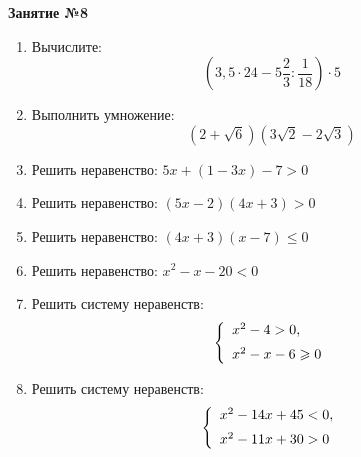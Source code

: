 \documentclass[12pt, a4paper]{article}
\begin{document}
	
	   \cfoot{}
	\begin{center}
		\Large
		\textbf{Занятие №8}
	\end{center}
	\begin{enumerate}[label=\textbf{\arabic*.}]
		\item Вычислите: $$\left( 3,5 \cdot 24 - 5\dfrac{2}{3}:\dfrac{1}{18}\right)\cdot 5 $$
		\item Выполнить умножение: $$(2+\sqrt{6})(3\sqrt{2}-2\sqrt{3})$$
		\item Решить неравенство: \( 5x+(1-3x)-7>0 \)
		\item Решить неравенство: \( (5x-2)(4x+3)>0 \)
		\item Решить неравенство: \( (4x+3)(x-7)\leqslant0 \)
		\item Решить неравенство: \( x^2-x-20<0\)
		\item Решить систему неравенств:
		$$\left\{
		\begin{array}{l}
			x^2-4>0,\vspace{0,2cm}\\
			x^2-x-6\geqslant0
		\end{array}
		\right.$$
		\item Решить систему неравенств:
		$$\left\{
		\begin{array}{l}
			x^2-14x+45<0,\vspace{0,2cm}\\
			x^2-11x+30>0
		\end{array}
		\right.$$
	\end{enumerate}
\end{document}
